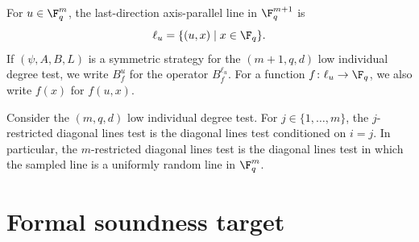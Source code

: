 \begin{definition}\label{not:conditioned-on-last-direction}
	\leanok
	For $u \in \F_q^m$, the last-direction axis-parallel line in $\F_q^{m+1}$ is
	\[
		\ell_u = \{(u,x) \mid x \in \F_q\}.
	\]
	If $(\psi,A,B,L)$ is a symmetric strategy for the $(m+1,q,d)$ low individual degree test, we write $B_f^u$ for the operator $B_f^{\ell_u}$. For a function $f \colon \ell_u \to \F_q$, we also write $f(x)$ for $f(u,x)$.
\end{definition}

\begin{definition}\label{def:restricted-diagonal-lines-test}
	\leanok
	Consider the $(m,q,d)$ low individual degree test. For $j \in \{1,\dots,m\}$, the $j$-restricted diagonal lines test is the diagonal lines test conditioned on $i=j$. In particular, the $m$-restricted diagonal lines test is the diagonal lines test in which the sampled line is a uniformly random line in $\F_q^m$.
\end{definition}

\section{Formal soundness target}

